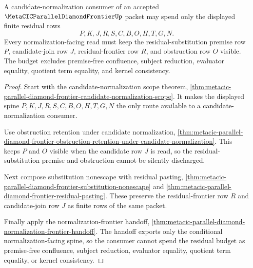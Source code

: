 \begin{theorem}
\label{thm:metacic-parallel-diamond-frontier-candidate-normalization-residual-budget}
A candidate-normalization consumer of an accepted $\MetaCICParallelDiamondFrontierUp$ packet may spend only the displayed finite residual rows
$$
P,K,J,R,S,C,B,O,H,T,G,N .
$$
Every normalization-facing read must keep the residual-substitution premise row $P$, candidate-join row $J$, residual-frontier row $R$, and obstruction row $O$ visible. The budget excludes premise-free confluence, subject reduction, evaluator equality, quotient term equality, and kernel consistency.
\end{theorem}
\begin{proof}
Start with the candidate-normalization scope theorem, \autoref{thm:metacic-parallel-diamond-frontier-candidate-normalization-scope}. It makes the displayed spine $P,K,J,R,S,C,B,O,H,T,G,N$ the only route available to a candidate-normalization consumer.

Use obstruction retention under candidate normalization, \autoref{thm:metacic-parallel-diamond-frontier-obstruction-retention-under-candidate-normalization}. This keeps $P$ and $O$ visible when the candidate row $J$ is read, so the residual-substitution premise and obstruction cannot be silently discharged.

Next compose substitution nonescape with residual pasting, \autoref{thm:metacic-parallel-diamond-frontier-substitution-nonescape} and \autoref{thm:metacic-parallel-diamond-frontier-residual-pasting}. These preserve the residual-frontier row $R$ and candidate-join row $J$ as finite rows of the same packet.

Finally apply the normalization-frontier handoff, \autoref{thm:metacic-parallel-diamond-normalization-frontier-handoff}. The handoff exports only the conditional normalization-facing spine, so the consumer cannot spend the residual budget as premise-free confluence, subject reduction, evaluator equality, quotient term equality, or kernel consistency.
\end{proof}

